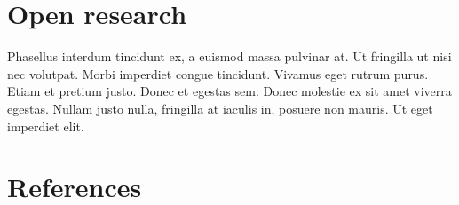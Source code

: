 \documentclass[
  number,
  preprint,
  3p,
  onecolumn]{elsarticle}
\begin{document}
\section{Open research}\label{open-research}

Phasellus interdum tincidunt ex, a euismod massa pulvinar at. Ut
fringilla ut nisi nec volutpat. Morbi imperdiet congue tincidunt.
Vivamus eget rutrum purus. Etiam et pretium justo. Donec et egestas sem.
Donec molestie ex sit amet viverra egestas. Nullam justo nulla,
fringilla at iaculis in, posuere non mauris. Ut eget imperdiet elit.

\section*{References}\label{references}

\renewcommand{\bibsection}{}

\end{document}

